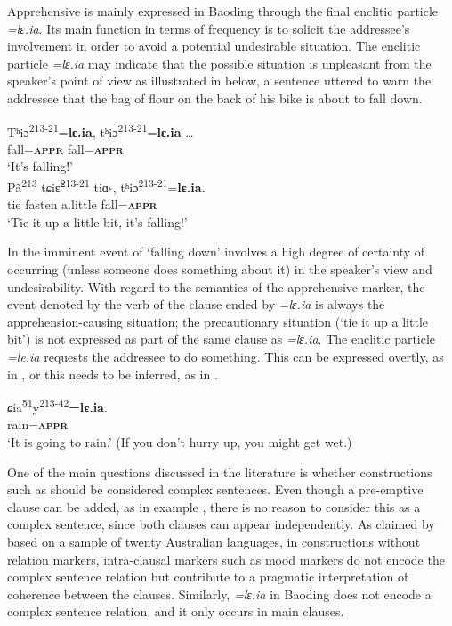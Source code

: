 \documentclass[output=paper,colorlinks,citecolor=brown, language=chinese]{langscibook}
\begin{document}
Apprehensive is mainly expressed in Baoding through the final enclitic particle \textit{=lɛ.ia}. Its main function in terms of frequency is to solicit the addressee's involvement in order to avoid a potential undesirable situation. The enclitic particle \textit{=lɛ.ia} may indicate that the possible situation is unpleasant from the speaker's point of view as illustrated in  below, a sentence uttered to warn the addressee that the bag of flour on the back of his bike is about to fall down.


\ea \label{ex:Song13}
\ea \label{ex:Song13a}
\gll Tʰiɔ\textsuperscript{213-21}=\textbf{lɛ.ia}, tʰiɔ\textsuperscript{213-21}=\textbf{lɛ.ia} \ldots \\
fall=\textsc{\textbf{appr}} fall=\textsc{\textbf{appr}} \\
\glt `It's falling!' \\
\ex \label{ex:Song13b}
\gll Pã\textsuperscript{213} tɕiɛ̃\textsuperscript{213-21} tiɑ˞, tʰiɔ\textsuperscript{213-21}=\textbf{lɛ.ia.} \\
tie fasten a.little fall=\textsc{\textbf{appr}} \\
\glt `Tie it up a little bit, it's falling!'
\z
\z


\noindent In  the imminent event of `falling down' involves a high degree of certainty of occurring (unless someone does something about it) in the speaker's view and undesirability. With regard to the semantics of the apprehensive marker, the event denoted by the verb of the clause ended by \textit{=lɛ.ia} is always the apprehension-causing situation; the precautionary situation (`tie it up a little bit') is not expressed as part of the same clause as \textit{=lɛ.ia}. The enclitic particle \textit{=le.ia} requests the addressee to do something. This can be expressed overtly, as in , or this needs to be inferred, as in .

\ea\label{ex:Song14}
\gll ɕia\textsuperscript{51}y\textsuperscript{213-42}\textbf{=lɛ.ia}. \\
rain=\textsc{\textbf{appr}}\\
\glt `It is going to rain.' (If you don't hurry up, you might get wet.)
\z


One of the main questions discussed in the literature is whether constructions such as  should be considered complex sentences. Even though a pre-emptive clause can be added, as in example , there is no reason to consider this as a complex sentence, since both clauses can appear independently. As claimed by \citet[222]{verstraete2006b} based on a sample of twenty Australian languages, in constructions without relation markers, intra-clausal markers such as mood markers do not encode the complex sentence relation but contribute to a pragmatic interpretation of coherence between the clauses. Similarly, \textit{=lɛ.ia} in Baoding does not encode a complex sentence relation, and it only occurs in main clauses.
\end{document}
